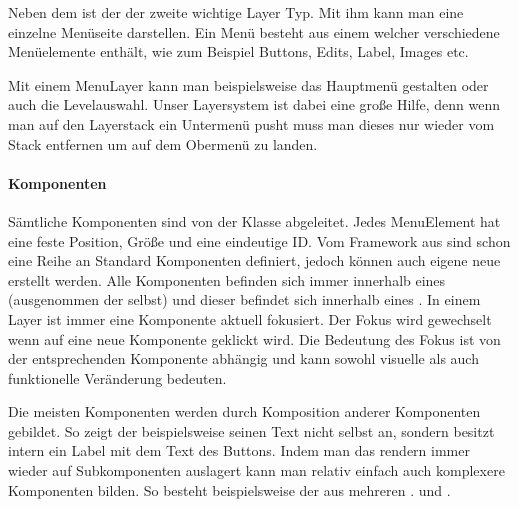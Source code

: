 Neben dem  ist der  der zweite wichtige Layer Typ. Mit ihm kann man eine einzelne Menüseite darstellen.
Ein Menü besteht aus einem  welcher verschiedene Menüelemente enthält, wie zum Beispiel Buttons, Edits, Label, Images etc.

Mit einem MenuLayer kann man beispielsweise das Hauptmenü gestalten oder auch die Levelauswahl. Unser Layersystem ist dabei eine große Hilfe, denn wenn man auf den Layerstack ein Untermenü pusht muss man dieses nur wieder vom Stack entfernen um auf dem Obermenü zu landen.

\paragraph{Komponenten}

Sämtliche Komponenten sind von der Klasse  abgeleitet. Jedes MenuElement hat eine feste Position, Größe und eine eindeutige ID. Vom Framework aus sind schon eine Reihe an Standard Komponenten definiert, jedoch können auch eigene neue erstellt werden.
Alle Komponenten befinden sich immer innerhalb eines  (ausgenommen der  selbst) und dieser befindet sich innerhalb eines . In einem Layer ist immer eine Komponente aktuell fokusiert. Der Fokus wird gewechselt wenn auf eine neue Komponente geklickt wird. Die Bedeutung des Fokus ist von der entsprechenden Komponente abhängig und kann sowohl visuelle als auch funktionelle Veränderung bedeuten.


Die meisten Komponenten werden durch Komposition anderer Komponenten gebildet. So zeigt der  beispielsweise seinen Text nicht selbst an, sondern besitzt intern ein Label mit dem Text des Buttons. Indem man das rendern immer wieder auf Subkomponenten auslagert kann man relativ einfach auch komplexere Komponenten bilden. So besteht beispielsweise der  aus mehreren .  und . 

